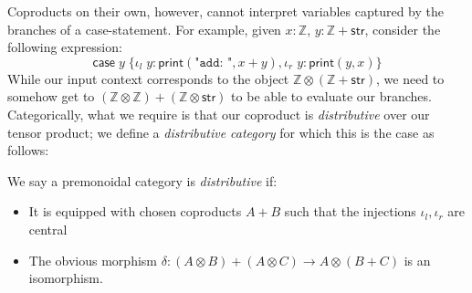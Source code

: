 \documentclass[acmsmall,screen,review]{acmart}
\newcommand{\mbb}[1]{\ensuremath{\mathbb{#1}}}
\newcommand{\ms}[1]{\ensuremath{\mathsf{#1}}}
\newcommand{\lto}{:}
\newcommand{\linl}[1]{\iota_l\;{#1}}
\newcommand{\linr}[1]{\iota_r\;{#1}}
\newcommand{\caseexpr}[5]{\ms{case}\;#1\;\{\linl{#2} \lto #3, \linr{#4} \lto #5\}}
\begin{document}
Coproducts on their own, however, cannot interpret variables captured by the branches of a
case-statement. For example, given $x : \mbb{Z}$, $y : \mbb{Z} + \ms{str}$, consider the following
expression:
$$
\caseexpr{y}{y}{\ms{print}(\texttt{"add: "}, x + y)}{y}{\ms{print}(y, x)}
$$
While our input context corresponds to the object $\mbb{Z} \otimes (\mbb{Z} + \ms{str})$, we need to
somehow get to $(\mbb{Z} \otimes \mbb{Z}) + (\mbb{Z} \otimes \ms{str})$ to be able to evaluate our
branches. Categorically, what we require is that our coproduct is \emph{distributive} over our
tensor product; we define a \emph{distributive category} for which this is the case as follows:
\begin{definition}
  We say a premonoidal category is \emph{distributive} if:
  \begin{itemize}
    \item It is equipped with chosen coproducts $A + B$ such that the injections $\iota_l, \iota_r$
    are central
    \item The obvious morphism $\delta : (A \otimes B) + (A \otimes C) \to A \otimes (B + C)$ is an
    isomorphism.
  \end{itemize}
\end{definition}
\end{document}

